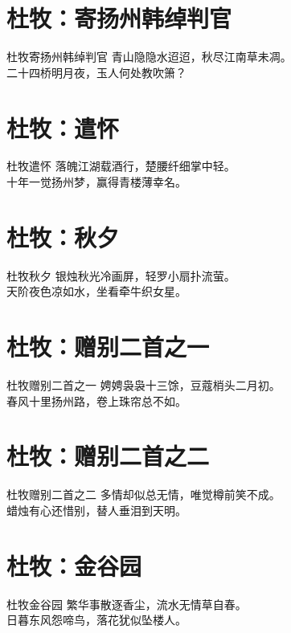 \documentclass[12pt,oneside,a5paper]{book}
\begin{document}
\chapter{杜牧：寄扬州韩绰判官}
\begin{poemzh}{杜牧}{寄扬州韩绰判官}
青山隐隐水迢迢，秋尽江南草未凋。\\
二十四桥明月夜，玉人何处教吹箫？\\ 
\end{poemzh}

\chapter{杜牧：遣怀}
\begin{poemzh}{杜牧}{遣怀}
落魄江湖载酒行，楚腰纤细掌中轻。\\
十年一觉扬州梦，赢得青楼薄幸名。\\ 
\end{poemzh}

\chapter{杜牧：秋夕}
\begin{poemzh}{杜牧}{秋夕}
银烛秋光冷画屏，轻罗小扇扑流萤。\\
天阶夜色凉如水，坐看牵牛织女星。\\ 
\end{poemzh}

\chapter{杜牧：赠别二首之一}
\begin{poemzh}{杜牧}{赠别二首之一}
娉娉袅袅十三馀，豆蔻梢头二月初。\\
春风十里扬州路，卷上珠帘总不如。\\ 
\end{poemzh}

\chapter{杜牧：赠别二首之二}
\begin{poemzh}{杜牧}{赠别二首之二}
多情却似总无情，唯觉樽前笑不成。\\
蜡烛有心还惜别，替人垂泪到天明。\\ 
\end{poemzh}

\chapter{杜牧：金谷园}
\begin{poemzh}{杜牧}{金谷园}
繁华事散逐香尘，流水无情草自春。\\
日暮东风怨啼鸟，落花犹似坠楼人。\\ 
\end{poemzh}
\end{document}
